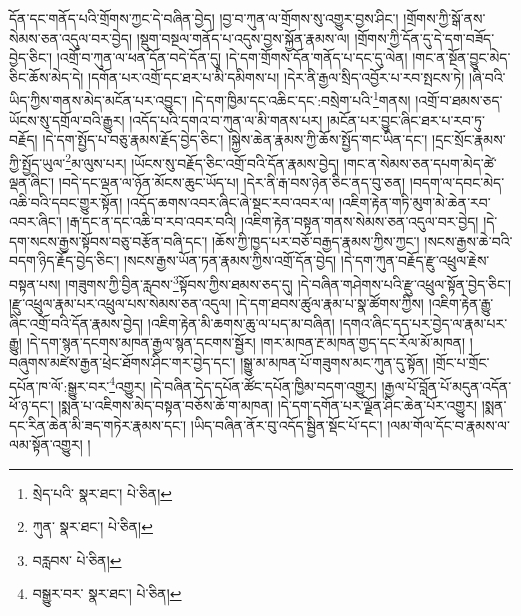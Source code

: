དོན་དང་གནོད་པའི་གྲོགས་ཀྱང་དེ་བཞིན་བྱེད། །བྱ་བ་ཀུན་ལ་གྲོགས་སུ་འགྱུར་བྱས་ཤིང་། །གྲོགས་ཀྱི་སྒོ་ནས་སེམས་ཅན་འདུལ་བར་བྱེད། །སྡུག་བསྔལ་གནོད་པ་འདུས་བྱས་སྐྱོན་རྣམས་ལ། །གྲོགས་ཀྱི་དོན་དུ་དེ་དག་བཟོད་བྱེད་ཅིང་། །འགྲོ་བ་ཀུན་ལ་ཕན་དོན་བདེ་དོན་དུ། །དེ་དག་གྲོགས་དོན་གནོད་པ་དང་དུ་ལེན། །གང་ན་སྔོན་བྱུང་མེད་ཅིང་ཆོས་མེད་དེ། །དགོན་པར་འགྲོ་དང་ཐར་པ་མི་དམིགས་པ། །དེར་ནི་རྒྱལ་སྲིད་འབྱོར་པ་རབ་སྤངས་ཏེ། །ཞི་བའི་ཡིད་ཀྱིས་གནས་མེད་མངོན་པར་འབྱུང་། །དེ་དག་ཁྱིམ་དང་འཆིང་དང་:བསྲེག་པའི་\footnote{སྲེད་པའི་  སྣར་ཐང་།  པེ་ཅིན། }གནས། །འགྲོ་བ་ཐམས་ཅད་ཡོངས་སུ་དགྲོལ་བའི་རྒྱུར། །འདོད་པའི་དགའ་བ་ཀུན་ལ་མི་གནས་པར། །མངོན་པར་བྱུང་ཞིང་ཐར་པ་རབ་ཏུ་བརྗོད། །དེ་དག་སྤྱོད་པ་བཅུ་རྣམས་རྗོད་བྱེད་ཅིང་། །སྐྱེས་ཆེན་རྣམས་ཀྱི་ཆོས་སྤྱོད་གང་ཡིན་དང་། །དྲང་སྲོང་རྣམས་ཀྱི་སྤྱོད་ཡུལ་\footnote{ཀུན་  སྣར་ཐང་།  པེ་ཅིན། }མ་ལུས་པར། །ཡོངས་སུ་བརྗོད་ཅིང་འགྲོ་བའི་དོན་རྣམས་བྱེད། །གང་ན་སེམས་ཅན་དཔག་མེད་ཚེ་ལྡན་ཞིང་། །བདེ་དང་ལྡན་ལ་ཉོན་མོངས་ཆུང་ཡོད་པ། །དེར་ནི་རྒ་བས་ཉེན་ཅིང་ནད་བུ་ཅན། །བདག་ལ་དབང་མེད་འཆི་བའི་དབང་གྱུར་སྟོན། །འདོད་ཆགས་འབར་ཞིང་ཞེ་སྡང་རབ་འབར་ལ། །འཇིག་རྟེན་གཏི་མུག་མེ་ཆེན་རབ་འབར་ཞིང་། །རྒ་དང་ན་དང་འཆི་བ་རབ་འབར་བའི། །འཇིག་རྟེན་བསྟན་གནས་སེམས་ཅན་འདུལ་བར་བྱེད། །དེ་དག་སངས་རྒྱས་སྟོབས་བཅུ་བརྩོན་བཞི་དང་། །ཆོས་ཀྱི་ཁྱད་པར་བཅོ་བརྒྱད་རྣམས་ཀྱིས་ཀྱང་། །སངས་རྒྱས་ཆེ་བའི་བདག་ཉིད་རྗོད་བྱེད་ཅིང་། །སངས་རྒྱས་ཡོན་ཏན་རྣམས་ཀྱིས་འགྲོ་དོན་བྱེད། །དེ་དག་ཀུན་བརྗོད་རྫུ་འཕྲུལ་རྗེས་བསྟན་པས། །གཟུགས་ཀྱི་བྱིན་རླབས་\footnote{བརླབས་  པེ་ཅིན། }སྟོབས་ཀྱིས་ཐམས་ཅད་དུ། །དེ་བཞིན་གཤེགས་པའི་རྫུ་འཕྲུལ་སྟོན་བྱེད་ཅིང་། །རྫུ་འཕྲུལ་རྣམ་པར་འཕྲུལ་པས་སེམས་ཅན་འདུལ། །དེ་དག་ཐབས་ཚུལ་རྣམ་པ་སྣ་ཚོགས་ཀྱིས། །འཇིག་རྟེན་རྒྱུ་ཞིང་འགྲོ་བའི་དོན་རྣམས་བྱེད། །འཇིག་རྟེན་མི་ཆགས་ཆུ་ལ་པད་མ་བཞིན། །དགའ་ཞིང་དད་པར་བྱེད་ལ་རྣམ་པར་རྒྱུ། །དེ་དག་སྙན་དངགས་མཁན་རྒྱལ་སྙན་དངགས་སྦྱོར། །གར་མཁན་རྔ་མཁན་གྱད་དང་རོལ་མོ་མཁན། །བཞུགས་མཛེས་རྒྱན་ཕྲེང་ཐོགས་ཤིང་གར་བྱེད་དང་། །སྒྱུ་མ་མཁན་པོ་གཟུགས་མང་ཀུན་དུ་སྟོན། །གྲོང་པ་གྲོང་དཔོན་ཁ་ལོ་:སྒྱུར་བར་\footnote{བསྒྱུར་བར་  སྣར་ཐང་།  པེ་ཅིན། }འགྱུར། །དེ་བཞིན་དེད་དཔོན་ཚོང་དཔོན་ཁྱིམ་བདག་འགྱུར། །རྒྱལ་པོ་བློན་པོ་མདུན་འདོན་ཕོ་ཉ་དང་། །སྨན་པ་འཇིགས་མེད་བསྟན་བཅོས་ཆོ་ག་མཁན། །དེ་དག་དགོན་པར་ལྗོན་ཤིང་ཆེན་པོར་འགྱུར། །སྨན་དང་རིན་ཆེན་མི་ཟད་གཏེར་རྣམས་དང་། །ཡིད་བཞིན་ནོར་བུ་འདོད་སྦྱིན་སྡོང་པོ་དང་། །ལམ་གོལ་དོང་བ་རྣམས་ལ་ལམ་སྟོན་འགྱུར། །
